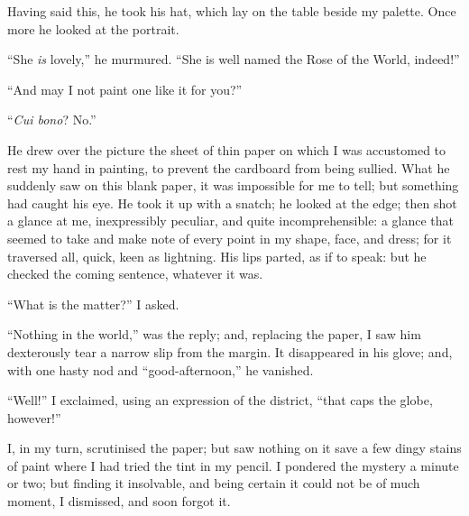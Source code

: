 Having said this, he took his hat, which lay on the table beside my
palette. Once more he looked at the portrait.

\enquote{She \emph{is} lovely,} he murmured. \enquote{She is well named the
	Rose of the World, indeed!}

\enquote{And may I not paint one like it for you?}

\enquote{\emph{Cui bono}? No.}

He drew over the picture the sheet of thin paper on which I was
accustomed to rest my hand in painting, to prevent the cardboard from
being sullied. What he suddenly saw on this blank paper, it was
impossible for me to tell; but something had caught his eye. He took it
up with a snatch; he looked at the edge; then shot a glance at me,
inexpressibly peculiar, and quite incomprehensible: a glance that seemed
to take and make note of every point in my shape, face, and dress; for
it traversed all, quick, keen as lightning. His lips parted, as if to
speak: but he checked the coming sentence, whatever it was.

\enquote{What is the matter?} I asked.

\enquote{Nothing in the world,} was the reply; and, replacing the paper,
I saw him dexterously tear a narrow slip from the margin. It
disappeared in his glove; and, with one hasty nod and
\enquote{good-afternoon,} he vanished.

\enquote{Well!} I exclaimed, using an expression of the district,
\enquote{that caps the globe, however!}

I, in my turn, scrutinised the paper; but saw nothing on it save a few
dingy stains of paint where I had tried the tint in my pencil. I
pondered the mystery a minute or two; but finding it insolvable, and
being certain it could not be of much moment, I dismissed, and soon
forgot it.
